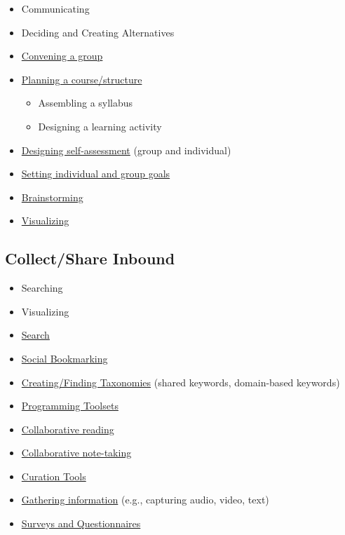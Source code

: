 \begin{itemize}
\item
  Communicating
\item
  Deciding and Creating Alternatives
\end{itemize}
\begin{itemize}
\item
  \href{http://peeragogy.org/convening-group/}{Convening a group}
\item
  \href{http://peeragogy.org/planning-a-coursestructure/}{Planning a
  course/structure}
  \begin{itemize}
  \item
    Assembling a syllabus
  \end{itemize}
  \begin{itemize}
  \item
    Designing a learning activity
  \end{itemize}
\item
  \href{http://peeragogy.org/designing-self-assessment/}{Designing
  self-assessment} (group and individual)
\item
  \href{http://peeragogy.org/setting-goals/}{Setting individual and
  group goals}
\item
  \href{http://peeragogy.org/brainstorming/}{Brainstorming}
\item
  \href{http://peeragogy.org/visualizing/}{Visualizing}
\end{itemize}
\subsection{Collect/Share Inbound}

\begin{itemize}
\item
  Searching
\item
  Visualizing
\end{itemize}
\begin{itemize}
\item
  \href{http://peeragogy.org/search/}{Search}
\item
  \href{http://peeragogy.org/social-bookmarking/}{Social Bookmarking}
\item
  \href{http://peeragogy.org/taxonomics/}{Creating/Finding Taxonomies}
  (shared keywords, domain-based keywords)
\item
  \href{http://peeragogy.org/programming-toolsets/}{Programming
  Toolsets}
\item
  \href{http://peeragogy.org/collaborative-reading/}{Collaborative
  reading}
\item
  \href{http://peeragogy.org/collaborative-note-taking/}{Collaborative
  note-taking}
\item
  \href{http://peeragogy.org/curation-tools/}{Curation Tools}
\item
  \href{http://peeragogy.org/recording-information-inputs/}{Gathering
  information} (e.g., capturing audio, video, text)
\item
  \href{http://peeragogy.org/surveys-and-questionnaires/}{Surveys and
  Questionnaires}
\end{itemize}
